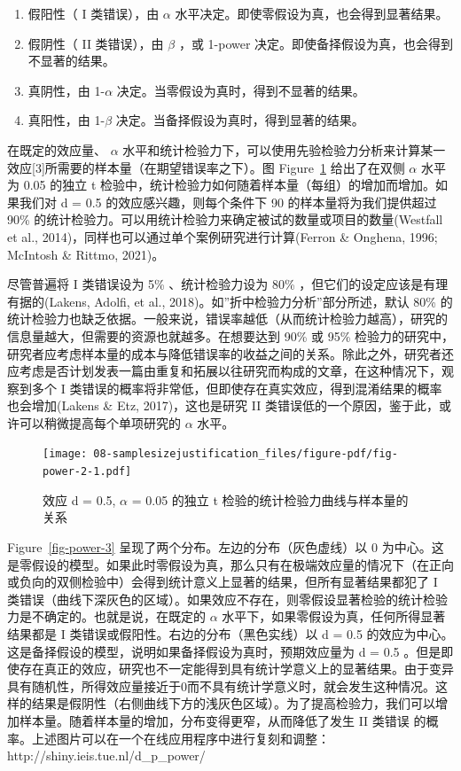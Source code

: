 \documentclass[
  letterpaper,
  DIV=11,
  numbers=noendperiod]{scrreprt}
\providecommand{\tightlist}{%
  \setlength{\itemsep}{0pt}\setlength{\parskip}{0pt}}\usepackage{longtable,booktabs,array}
\begin{document}
\begin{enumerate}
\def\labelenumi{\arabic{enumi}.}
\tightlist
\item
  假阳性（ I 类错误），由 \(\alpha\)
  水平决定。即使零假设为真，也会得到显著结果。
\item
  假阴性（ II 类错误），由 \(\beta\) ，或 1-power
  决定。即使备择假设为真，也会得到不显著的结果。
\item
  真阴性，由 1-\(\alpha\) 决定。当零假设为真时，得到不显著的结果。
\item
  真阳性，由 1-\(\beta\) 决定。当备择假设为真时，得到显著的结果。
\end{enumerate}

在既定的效应量、 \(\alpha\)
水平和统计检验力下，可以使用先验检验力分析来计算某一效应{[}3{]}所需要的样本量（在期望错误率之下）。图
Figure~\ref{fig-power-2} 给出了在双侧 \(\alpha\) 水平为 0.05 的独立 t
检验中，统计检验力如何随着样本量（每组）的增加而增加。如果我们对 d = 0.5
的效应感兴趣，则每个条件下 90 的样本量将为我们提供超过 90\%
的统计检验力。可以用统计检验力来确定被试的数量或项目的数量(Westfall et
al., 2014)，同样也可以通过单个案例研究进行计算(Ferron \& Onghena, 1996;
McIntosh \& Rittmo, 2021)。

尽管普遍将 I 类错误设为 5\% 、统计检验力设为 80\%
，但它们的设定应该是有理有据的(Lakens, Adolfi, et al.,
2018)。如''折中检验力分析''部分所述，默认 80\%
的统计检验力也缺乏依据。一般来说，错误率越低（从而统计检验力越高），研究的信息量越大，但需要的资源也就越多。在想要达到
90\% 或 95\%
检验力的研究中，研究者应考虑样本量的成本与降低错误率的收益之间的关系。除此之外，研究者还应考虑是否计划发表一篇由重复和拓展以往研究而构成的文章，在这种情况下，观察到多个
I
类错误的概率将非常低，但即使存在真实效应，得到混淆结果的概率也会增加(Lakens
\& Etz, 2017)，这也是研究 II
类错误低的一个原因，鉴于此，或许可以稍微提高每个单项研究的 \(\alpha\)
水平。

\begin{figure}

{\centering \texttt{[image: 08-samplesizejustification\_files/figure-pdf/fig-power-2-1.pdf]}

}

\caption{\label{fig-power-2}效应 d = 0.5, \(\alpha\) = 0.05 的独立 t
检验的统计检验力曲线与样本量的关系}

\end{figure}

Figure~\ref{fig-power-3} 呈现了两个分布。左边的分布（灰色虚线）以 0
为中心。这是零假设的模型。如果此时零假设为真，那么只有在极端效应量的情况下（在正向或负向的双侧检验中）会得到统计意义上显著的结果，但所有显著结果都犯了
I
类错误（曲线下深灰色的区域）。如果效应不存在，则零假设显著检验的统计检验力是不确定的。也就是说，在既定的
\(\alpha\) 水平下，如果零假设为真，任何所得显著结果都是 I
类错误或假阳性。右边的分布（黑色实线）以 d = 0.5
的效应为中心。这是备择假设的模型，说明如果备择假设为真时，预期效应量为 d
= 0.5
。但是即使存在真正的效应，研究也不一定能得到具有统计学意义上的显著结果。由于变异具有随机性，所得效应量接近于0而不具有统计学意义时，就会发生这种情况。这样的结果是假阴性（右侧曲线下方的浅灰色区域）。为了提高检验力，我们可以增加样本量。随着样本量的增加，分布变得更窄，从而降低了发生
II 类错误
的概率。上述图片可以在一个在线应用程序中进行复刻和调整：http://shiny.ieis.tue.nl/d\_p\_power/
\end{document}
